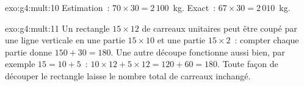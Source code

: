 \begin{solution}{exo:g4:mult:10}
Estimation~: $70 \times 30 = 2\,100$~kg. Exact~:
$67 \times 30 = 2\,010$~kg.
\end{solution}

\begin{solution}{exo:g4:mult:11}
Un rectangle $15 \times 12$ de carreaux unitaires peut être coupé
par une ligne verticale en une partie $15 \times 10$ et une partie
$15 \times 2$~: compter chaque partie donne $150 + 30 = 180$. Une
autre découpe fonctionne aussi bien, par exemple
$15 = 10 + 5$~: $10 \times 12 + 5 \times 12 = 120 + 60
= 180$. Toute façon de découper le rectangle laisse le nombre total
de carreaux inchangé.
\end{solution}
